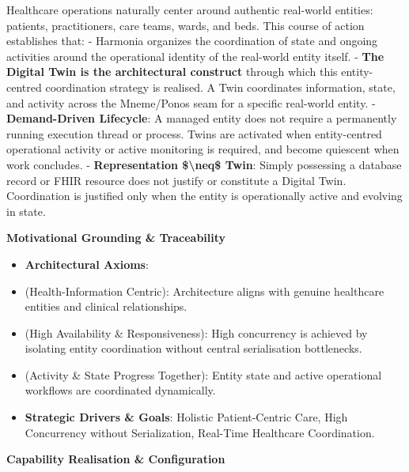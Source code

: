 Healthcare operations naturally center around authentic real-world entities: patients, practitioners, care teams, wards, and beds. This course of action establishes that:
- Harmonia organizes the coordination of state and ongoing activities around the operational identity of the real-world entity itself.
- \textbf{The Digital Twin is the architectural construct} through which this entity-centred coordination strategy is realised. A Twin coordinates information, state, and activity across the Mneme/Ponos seam for a specific real-world entity.
- \textbf{Demand-Driven Lifecycle}: A managed entity does not require a permanently running execution thread or process. Twins are activated when entity-centred operational activity or active monitoring is required, and become quiescent when work concludes.
- \textbf{Representation \$\textbackslash{}neq\$ Twin}: Simply possessing a database record or FHIR resource does not justify or constitute a Digital Twin. Coordination is justified only when the entity is operationally active and evolving in state.



\par\medskip\textbf{Motivational Grounding \& Traceability}\par


\begin{itemize}


\item \textbf{Architectural Axioms}:

\item \texttt{} (Health-Information Centric): Architecture aligns with genuine healthcare entities and clinical relationships.

\item \texttt{} (High Availability \& Responsiveness): High concurrency is achieved by isolating entity coordination without central serialisation bottlenecks.

\item \texttt{} (Activity \& State Progress Together): Entity state and active operational workflows are coordinated dynamically.

\item \textbf{Strategic Drivers \& Goals}: Holistic Patient-Centric Care, High Concurrency without Serialization, Real-Time Healthcare Coordination.

\end{itemize}


\par\medskip\textbf{Capability Realisation \& Configuration}\par


